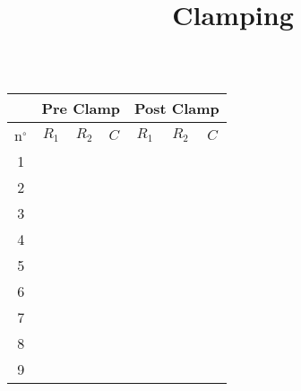 \documentclass{config}
\title{Clamping}
\begin{document}
\maketitle

\begin{table}[H]
\begin{center}
\begin{tabular}{|c|c|c|c|c|c|c|}
\hline
& \multicolumn{3}{|c|}{Pre Clamp} &  \multicolumn{3}{|c|}{Post Clamp} \\
\hline 
\rowcolor[gray]{0.85} n$^{\circ}$ & $R_1$ & $R_2$ & $C$  & $R_1$ & $R_2$ & $C$\\
\hline
1 & & & & & & \\
\hline 
2 & & & & & &   \\
\hline 
3 & & & & & &    \\
\hline 
4 & & & & & &  \\
\hline 
5 & & & & & &  \\
\hline 
6 & & & & & &  \\
\hline 
7 & & & & & &  \\
\hline 
8 & & & & & &  \\
\hline 
9 & & & & & &  \\ 
\hline 
\end{tabular}
\caption{  }
\label{param_est_tab}
\end{center}
\end{table}
\end{document}

